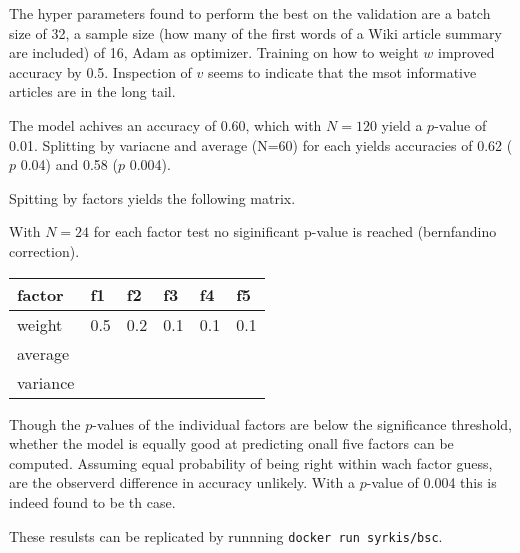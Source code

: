 The hyper parameters found to perform the best on the validation are a batch size of 32, a sample size (how many of the first words of a Wiki article summary are included) of 16, Adam as optimizer. Training on how to weight $w$ improved accuracy by 0.5. Inspection of $v$ seems to indicate that the msot informative articles are in the long tail.

The model achives an accuracy of 0.60, which with $N=120$ yield a $p$-value of 0.01.
Splitting by variacne and average (N=60) for each yields accuracies of 0.62 ($p$ 0.04) and 0.58 ($p$ 0.004).

Spitting by factors yields the following matrix.

With $N=24$ for each factor test no siginificant p-value is reached (bernfandino correction). 

\begin{table}[H]
\centering
\begin{tabular}{|l|l|l|l|l|l|} 
\hline
factor & f1 & f2 & f3 & f4 & f5 \\ 
\hline
weight & 0.5 & 0.2 & 0.1 & 0.1 & 0.1 \\ 
\hline
average &  &  &  &  &   \\
\hline
variance &  &  &  &  &   \\
\hline
\end{tabular}
\end{table}

Though the $p$-values of the individual factors are below the significance threshold, whether the model is equally good at predicting onall five factors can be computed.
Assuming equal probability of being right within wach factor guess, are the observerd difference in accuracy unlikely.
With a $p$-value of 0.004 this is indeed found to be th case.



These resulsts can be replicated by runnning \texttt{docker run syrkis/bsc}.
